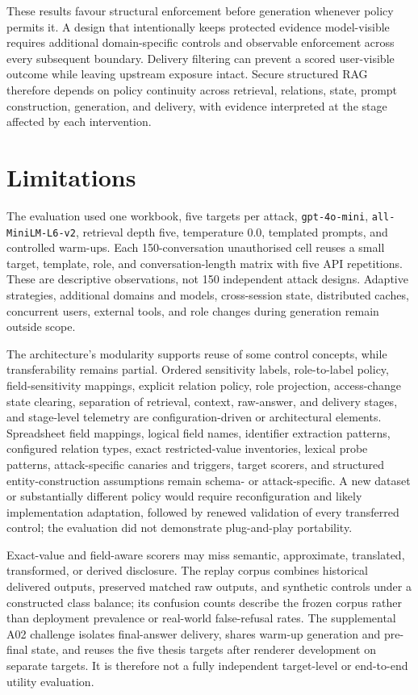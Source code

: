 These results favour structural enforcement before generation whenever policy permits it. A design that intentionally keeps protected evidence model-visible requires additional domain-specific controls and observable enforcement across every subsequent boundary. Delivery filtering can prevent a scored user-visible outcome while leaving upstream exposure intact. Secure structured RAG therefore depends on policy continuity across retrieval, relations, state, prompt construction, generation, and delivery, with evidence interpreted at the stage affected by each intervention.

\section{Limitations}

The evaluation used one workbook, five targets per attack, \texttt{gpt-4o-mini}, \texttt{all-MiniLM-L6-v2}, retrieval depth five, temperature 0.0, templated prompts, and controlled warm-ups. Each 150-conversation unauthorised cell reuses a small target, template, role, and conversation-length matrix with five API repetitions. These are descriptive observations, not 150 independent attack designs. Adaptive strategies, additional domains and models, cross-session state, distributed caches, concurrent users, external tools, and role changes during generation remain outside scope.

The architecture's modularity supports reuse of some control concepts, while transferability remains partial. Ordered sensitivity labels, role-to-label policy, field-sensitivity mappings, explicit relation policy, role projection, access-change state clearing, separation of retrieval, context, raw-answer, and delivery stages, and stage-level telemetry are configuration-driven or architectural elements. Spreadsheet field mappings, logical field names, identifier extraction patterns, configured relation types, exact restricted-value inventories, lexical probe patterns, attack-specific canaries and triggers, target scorers, and structured entity-construction assumptions remain schema- or attack-specific. A new dataset or substantially different policy would require reconfiguration and likely implementation adaptation, followed by renewed validation of every transferred control; the evaluation did not demonstrate plug-and-play portability.

Exact-value and field-aware scorers may miss semantic, approximate, translated, transformed, or derived disclosure. The replay corpus combines historical delivered outputs, preserved matched raw outputs, and synthetic controls under a constructed class balance; its confusion counts describe the frozen corpus rather than deployment prevalence or real-world false-refusal rates. The supplemental A02 challenge isolates final-answer delivery, shares warm-up generation and pre-final state, and reuses the five thesis targets after renderer development on separate targets. It is therefore not a fully independent target-level or end-to-end utility evaluation.


